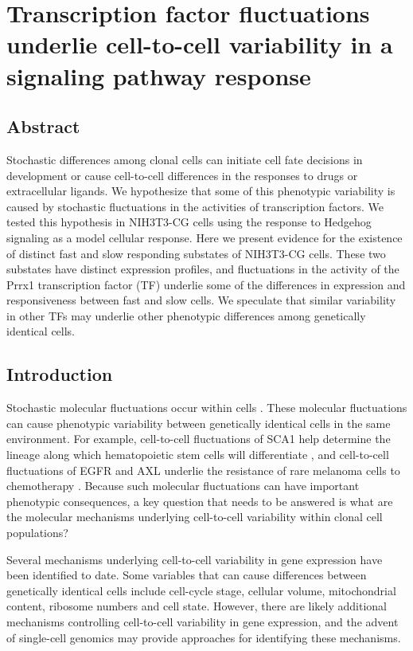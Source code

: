 \chapter{Transcription factor fluctuations underlie cell-to-cell variability in a signaling pathway response}
\label{chap:hedgehog}

\section{Abstract}
Stochastic differences among clonal cells can initiate cell fate decisions in development or cause cell-to-cell differences in the responses to drugs or extracellular ligands. We hypothesize that some of this phenotypic variability is caused by stochastic fluctuations in the activities of transcription factors. We tested this hypothesis in NIH3T3-CG cells using the response to Hedgehog signaling as a model cellular response. Here we present evidence for the existence of distinct fast and slow responding substates of NIH3T3-CG cells. These two substates have distinct expression profiles, and fluctuations in the activity of the Prrx1 transcription factor (TF) underlie some of the differences in expression and responsiveness between fast and slow cells. We speculate that similar variability in other TFs may underlie other phenotypic differences among genetically identical cells.
\section{Introduction}
Stochastic molecular fluctuations occur within cells \cite{Raser2004-pb,McAdams1997-zq}\cite{Ozbudak2002-dx,Elowitz2002-wn,Raj2006-oo}\cite{Blake2003-yd}. These molecular fluctuations can cause phenotypic variability between genetically identical cells in the same environment. For example, cell-to-cell fluctuations of SCA1 help determine the lineage along which hematopoietic stem cells will differentiate \cite{Chang2008-kv}, and cell-to-cell fluctuations of EGFR and AXL underlie the resistance of rare melanoma cells to chemotherapy \cite{Shaffer2017-ql,Shaffer2018-zl}. Because such molecular fluctuations can have important phenotypic consequences, a key question that needs to be answered is what are the molecular mechanisms underlying cell-to-cell variability within clonal cell populations?

Several mechanisms underlying cell-to-cell variability in gene expression have been identified to date. Some variables that can cause differences between genetically identical cells include cell-cycle stage\cite{Zopf2013-ua}, cellular volume\cite{Kempe2015-xy,Padovan-Merhar2015-cx}, mitochondrial content\cite{Neves2010-vn}, ribosome numbers \cite{Guido2007-rf} and cell state\cite{Topolewski2022-bw,Kiviet2014-vj,Iwamoto2016-wf}. However, there are likely additional mechanisms controlling cell-to-cell variability in gene expression, and the advent of single-cell genomics\cite{Trapnell2015-zd,Eling2019-cr} may provide approaches for identifying these mechanisms.
 
